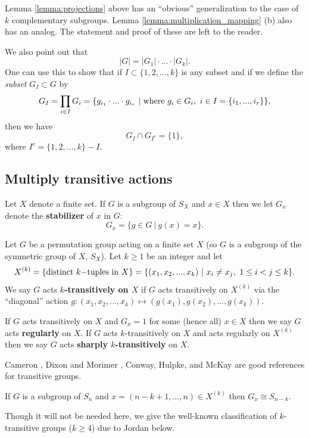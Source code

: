 \begin{remark}
Lemma \ref{lemma:projections} above has an 
``obvious'' generalization to the case of 
$k$ complementary subgroups. Lemma 
\ref{lemma:multiplication_mapping} (b) also has an analog.
The statement and proof of these
are left to the reader.

We also point out that 
\[
|G|=|G_1|\cdot ... \cdot |G_k|.
\]
One can use this to show that if $I\subset \{1,2,...,k\}$ is any subset
and if we define the {\it subset} $G_I\subset G$ by
\[
G_I=\prod_{i\in I}G_i=\{g_{i_1}\cdot ...\cdot g_{i_r}
\ |\ {\rm where}\ g_i\in G_i,\ i\in I=\{i_1,...,i_r\}\},
\]
then we have
\[
G_I\cap G_{I^c}=\{1\},
\]
where $I^c=\{1,2,...,k\}-I$. 
\end{remark}

\subsection{Multiply transitive actions}

Let $X$ denote a finite set. If $G$ is a subgroup of $S_X$
and $x\in X$ then we let $G_x$ denote the {\bf stabilizer} of
$x$ in $G$:
\[
G_x=\{ g\in G\ |\ g(x)=x\}.
\]

\begin{definition} 
Let $G$ be a permutation group acting on a 
finite set $X$ (so $G$ is a subgroup of the symmetric 
group of $X$, $S_X$). Let $k\geq 1$ be an integer and let
\[
X^{(k)}=\{{\rm distinct\ }k{\rm -tuples\ in\ }X\}
=\{(x_1,x_2,...,x_k)\ |\ x_i\not= x_j,\ 1\leq i<j\leq k\}.
\]
We say $G$ acts {\bf $k$-transitively on $X$} if $G$ acts
transitively on $X^{(k)}$ via the ``diagonal'' action
$g:(x_1,x_2,...,x_k)\longmapsto (g(x_1),g(x_2),...,g(x_k))$.

If $G$ acts transitively on $X$ and $G_x=1$ for some
(hence all) $x\in X$ then we say $G$ acts {\bf regularly}
on $X$. If $G$ acts $k$-transitively on $X$ 
and acts regularly on $X^{(k)}$ then we say $G$ acts
{\bf sharply $k$-transitively} on $X$.
\end{definition}

Cameron \cite{C}, Dixon and Morimer \cite{DM}, Conway,
Hulpke, and McKay \cite{CHM} are good references for
transitive groups.

\begin{example} If $G$ is a subgroup of $S_n$
and $x=(n-k+1,...,n)\in X^{(k)}$ then $G_x \cong S_{n-k}$.
\end{example}

Though it will not be needed here, we give the well-known
classification of $k$-transitive groups ($k\geq 4$)
due to Jordan below.

